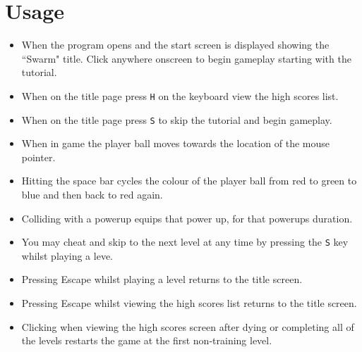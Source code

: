 \section{Usage}

\begin{itemize}
	\item When the program opens and the start screen is displayed showing the ``Swarm" title. Click anywhere onscreen to begin gameplay starting with the tutorial.
	\item When on the title page press \verb!H! on the keyboard view the high scores list.
	\item When on the title page press \verb!S! to skip the tutorial and begin gameplay.
	\item When in game the player ball moves towards the location of the mouse pointer.
	\item Hitting the space bar cycles the colour of the player ball from red to green to blue and then back to red again.
	\item Colliding with a powerup equips that power up, for that powerups duration.
	\item You may cheat and skip to the next level at any time by pressing the \verb!S! key whilst playing a leve.
	\item Pressing Escape whilst playing a level returns to the title screen.
	\item Pressing Escape whilst viewing the high scores list returns to the title screen.
	\item Clicking when viewing the high scores screen after dying or completing all of the levels restarts the game at the first non-training level.
\end{itemize}